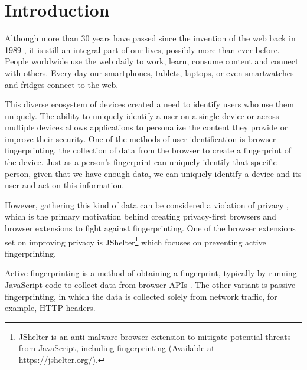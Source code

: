 
% 


\chapter{Introduction}

Although more than 30 years have passed since the invention of the web back in 1989 \cite{WWWProposal}, it is still an integral part of our lives, possibly more than ever before. People worldwide use the web daily to work, learn, consume content and connect with others. Every day our smartphones, tablets, laptops, or even smartwatches and fridges connect to the web.

This diverse ecosystem of devices created a need to identify users who use them uniquely. The ability to uniquely identify a user on a single device or across multiple devices allows applications to personalize the content they provide or improve their security.
One of the methods of user identification is browser fingerprinting, the collection of data from the browser to create a fingerprint of the device. Just as a person's fingerprint can uniquely identify that specific person, given that we have enough data, we can uniquely identify a device and its user and act on this information.

However, gathering this kind of data can be considered a violation of privacy \cite{WP224Fingerprinting}, which is the primary motivation behind creating privacy-first browsers and browser extensions to fight against fingerprinting. One of the browser extensions set on improving privacy is JShelter\footnote{JShelter is an anti-malware browser extension to mitigate potential threats from JavaScript, including fingerprinting \cite{JShelterHome} (Available at \url{https://jshelter.org/}).} which focuses on preventing active fingerprinting.

Active fingerprinting is a method of obtaining a fingerprint, typically by running JavaScript code to collect data from browser APIs \cite{FingerprintingSurvey}. The other variant is passive fingerprinting, in which the data is collected solely from network traffic, for example, HTTP headers.

